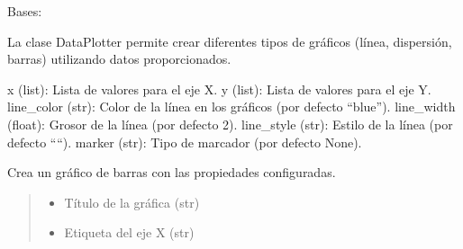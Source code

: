 \documentclass[letterpaper,10pt,spanish]{sphinxmanual}
\begin{document}
\begin{fulllineitems}
\label{\detokenize{pr8:pr8.2.DataPlotter}}
\pysigstartsignatures
{}
\pysigstopsignatures
\sphinxAtStartPar
Bases: 

\sphinxAtStartPar
La clase DataPlotter permite crear diferentes tipos de gráficos (línea, dispersión, barras) utilizando datos proporcionados.
\begin{description}
\sphinxAtStartPar
x (list): Lista de valores para el eje X.
y (list): Lista de valores para el eje Y.
line\_color (str): Color de la línea en los gráficos (por defecto “blue”).
line\_width (float): Grosor de la línea (por defecto 2).
line\_style (str): Estilo de la línea (por defecto “\sphinxhyphen{}“).
marker (str): Tipo de marcador (por defecto None).

\end{description}

\begin{fulllineitems}
\label{\detokenize{pr8:pr8.2.DataPlotter.bar}}
\pysigstartsignatures
{}
\pysigstopsignatures
\sphinxAtStartPar
Crea un gráfico de barras con las propiedades configuradas.
\begin{quote}\begin{description}
\begin{itemize}
\item {} 
\sphinxAtStartPar
{} \textendash{} Título de la gráfica (str)

\item {} 
\sphinxAtStartPar
{} \textendash{} Etiqueta del eje X (str)


\end{itemize}
\end{description}
\end{quote}
\end{fulllineitems}
\end{fulllineitems}
\end{document}
